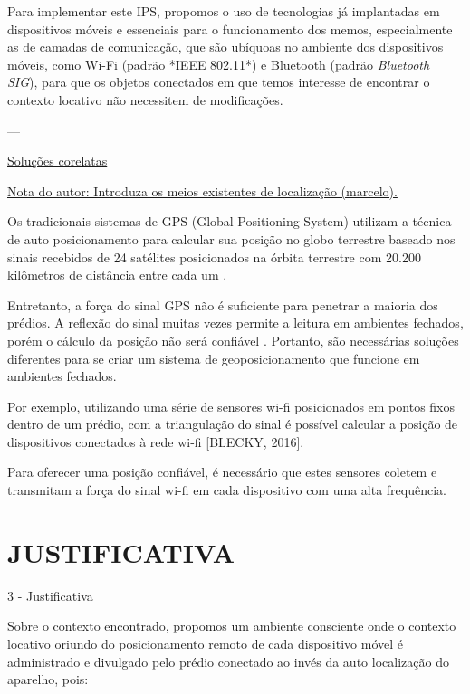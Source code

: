 \documentclass[
	12pt,				%
	openright,			%
	oneside,			%
	a4paper,			%
	chapter=TITLE,		%
	english,			%
	french,				%
	spanish,			%
	brazil				%
	]{abntex2}
\begin{document}
{Para implementar este IPS, propomos o uso de tecnologias já implantadas em
dispositivos móveis e essenciais para o funcionamento dos memos, especialmente
as de camadas de comunicação, que são ubíquoas no ambiente dos dispositivos
móveis, como Wi-Fi (padrão *IEEE 802.11*) e Bluetooth (padrão \textit{Bluetooth SIG}),
para que os objetos conectados em que temos interesse de encontrar o contexto
locativo não necessitem de modificações.

---

\underline{Soluções corelatas}

\underline{Nota do autor: Introduza os meios existentes de localização (marcelo).}


Os tradicionais sistemas de GPS (Global Positioning System) utilizam a técnica
de auto posicionamento para calcular sua posição no globo terrestre baseado nos
sinais recebidos de 24 satélites posicionados na órbita terrestre com 20.200
kilômetros de distância entre cada um \cite{Djuknic2001}.


Entretanto, a força do sinal GPS não é suficiente para penetrar a maioria dos
prédios. A reflexão do sinal muitas vezes permite a leitura em ambientes
fechados, porém o cálculo da posição não será confiável
\cite{Dartmouth2000}. Portanto, são necessárias soluções diferentes para
se criar um sistema de geoposicionamento que funcione em ambientes fechados.

Por exemplo, utilizando uma série de sensores wi-fi posicionados em pontos fixos
dentro de um prédio, com a triangulação do sinal é possível calcular a posição
de dispositivos conectados à rede wi-fi [BLECKY, 2016].

Para oferecer uma posição confiável, é necessário que estes sensores coletem e
transmitam a força do sinal wi-fi em cada dispositivo com uma alta frequência.


\chapter{JUSTIFICATIVA}
\label{chap:JUSTIFICATIVA}

 3 - Justificativa

Sobre o contexto encontrado, propomos um ambiente consciente onde o contexto
locativo oriundo do posicionamento remoto de cada dispositivo móvel é
administrado e divulgado pelo prédio conectado ao invés da auto localização do
aparelho, pois:

}
\end{document}
